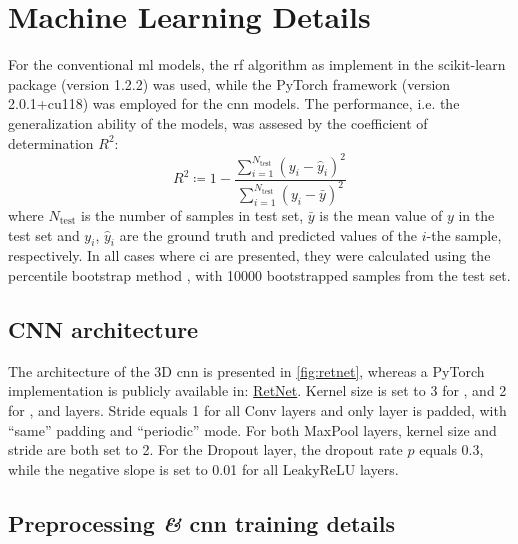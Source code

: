 \section{Machine Learning Details}

For the conventional \gls{ml} models, the \gls{rf} algorithm as implement in the
scikit-learn \parencite{sklearn} package (version
1.2.2) was used, while the PyTorch \parencite{pytorch}
framework (version 2.0.1+cu118) was employed for the \gls{cnn} models. The
performance, i.e. the generalization ability of
the models, was assesed by the coefficient of determination $R^2$:
\begin{equation}
	R^2 \coloneqq 1 -
	\frac{
		\sum_{i=1}^{N_\text{test}}
		(y_i - \hat{y}_i)^2
	}{
		\sum_{i=1}^{N_\text{test}}
		(y_i - \bar{y})^2
	}
\end{equation}
where $N_\text{test}$ is the number of samples in test
set, $\bar{y}$ is the mean value of $y$ in the test set and
$y_i$, $\hat{y}_i$ are the ground truth and predicted values of the $i$-the
sample, respectively. In all cases where \gls{ci} are presented, they were
calculated using the percentile bootstrap method \parencite{Efron_1994}, with
\num{10000} bootstrapped samples from the test set.

\subsection{CNN architecture}

The architecture of the 3D \gls{cnn} is presented in \Figure{} \ref{fig:retnet},
whereas a PyTorch implementation is publicly available in:
\href{https://github.com/frudakis-research-group/retnet}{RetNet}.
Kernel size is set to \num{3} for ,  and
\num{2} for ,  and  layers. Stride equals
\num{1} for all Conv layers and only  layer is padded,
with ``same'' padding and ``periodic'' mode. For both MaxPool
layers, kernel size and stride are both set to \num{2}. For
the Dropout layer, the dropout rate $p$
equals \num{0.3}, while the negative slope is set to \num{0.01} for all
LeakyReLU layers.

\subsection{Preprocessing \textit{\&} \acrshort{cnn} training details}
\label{subsec:preprocessing}

